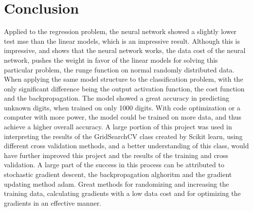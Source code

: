 \section{Conclusion}
\label{sec:conclusion}
Applied to the regression problem, the neural network
showed a slightly lower test mse than the linear models, which is an
impressive result. Although this is impressive, and shows 
that the neural network works, the data cost of the neural network,
pushes the weight in favor of the linear models for solving
this particular problem, the runge function on normal randomly distributed data.
When applying the same model structure to 
the classification problem, with the only significant difference being
the output activation function, the cost function
and the backpropagation. The model showed a great accuracy
in predicting unknown digits, when trained on only 1000 digits.
With code optimization or a computer with more power, the 
model could be trained on more data, and thus achieve a higher overall accuracy.
A large portion of this project was 
used in interpreting the results of the
GridSearchCV class created by
Scikit learn, using different 
cross validation methods, and
a better understanding of this class,
would have further improved this project
and the results of the training and
cross validation. 
A large part of the success in this process
can be attributed to stochastic gradient descent,
the backpropagation alghoritm and the 
gradient updating method adam. Great methods
for randomizing and increasing the training data, 
calculating gradients with a low data cost and for 
optimizing the gradients in an effective manner.